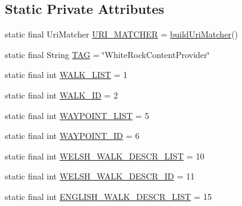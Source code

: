 \subsection*{Static Private Attributes}
\begin{DoxyCompactItemize}
\item 
static final Uri\+Matcher \hyperlink{classuk_1_1ac_1_1swan_1_1digitaltrails_1_1database_1_1_white_rock_content_provider_aae5896ef2dd052622382cd0675c4e6a9}{U\+R\+I\+\_\+\+M\+A\+T\+C\+H\+E\+R} = \hyperlink{classuk_1_1ac_1_1swan_1_1digitaltrails_1_1database_1_1_white_rock_content_provider_afd9d77e8923413814d030dd003de4694}{build\+Uri\+Matcher}()
\item 
static final String \hyperlink{classuk_1_1ac_1_1swan_1_1digitaltrails_1_1database_1_1_white_rock_content_provider_ab837b138ec86184a611bee0ffb3b146e}{T\+A\+G} = \char`\"{}White\+Rock\+Content\+Provider\char`\"{}
\item 
static final int \hyperlink{classuk_1_1ac_1_1swan_1_1digitaltrails_1_1database_1_1_white_rock_content_provider_a612500111621e8629467a397ad1cc5b5}{W\+A\+L\+K\+\_\+\+L\+I\+S\+T} = 1
\item 
static final int \hyperlink{classuk_1_1ac_1_1swan_1_1digitaltrails_1_1database_1_1_white_rock_content_provider_aa54903f53f725f527d8149f32f0b8292}{W\+A\+L\+K\+\_\+\+I\+D} = 2
\item 
static final int \hyperlink{classuk_1_1ac_1_1swan_1_1digitaltrails_1_1database_1_1_white_rock_content_provider_a71e880d976f210c2b8f510afe82909c8}{W\+A\+Y\+P\+O\+I\+N\+T\+\_\+\+L\+I\+S\+T} = 5
\item 
static final int \hyperlink{classuk_1_1ac_1_1swan_1_1digitaltrails_1_1database_1_1_white_rock_content_provider_a9c78851dd10751a0da78aaaab02769c1}{W\+A\+Y\+P\+O\+I\+N\+T\+\_\+\+I\+D} = 6
\item 
static final int \hyperlink{classuk_1_1ac_1_1swan_1_1digitaltrails_1_1database_1_1_white_rock_content_provider_a9a0a5b6ec087f4fbfd7cac265b5ad76e}{W\+E\+L\+S\+H\+\_\+\+W\+A\+L\+K\+\_\+\+D\+E\+S\+C\+R\+\_\+\+L\+I\+S\+T} = 10
\item 
static final int \hyperlink{classuk_1_1ac_1_1swan_1_1digitaltrails_1_1database_1_1_white_rock_content_provider_a75ae70eecce5937877d507dec5fc55bf}{W\+E\+L\+S\+H\+\_\+\+W\+A\+L\+K\+\_\+\+D\+E\+S\+C\+R\+\_\+\+I\+D} = 11
\item 
static final int \hyperlink{classuk_1_1ac_1_1swan_1_1digitaltrails_1_1database_1_1_white_rock_content_provider_a999f5ed7dc0f9c9238d2e3db9893fb71}{E\+N\+G\+L\+I\+S\+H\+\_\+\+W\+A\+L\+K\+\_\+\+D\+E\+S\+C\+R\+\_\+\+L\+I\+S\+T} = 15

\end{DoxyCompactItemize}
